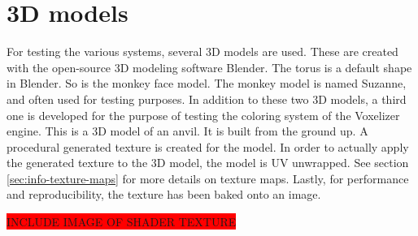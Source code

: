 \section{3D models}
For testing the various systems, several 3D models are used. These are created with the open-source 3D modeling software Blender. The torus is a default shape in Blender. So is the monkey face model. The monkey model is named Suzanne, and often used for testing purposes. In addition to these two 3D models, a third one is developed for the purpose of testing the coloring system of the Voxelizer engine. This is a 3D model of an anvil. It is built from the ground up. A procedural generated texture is created for the model. In order to actually apply the generated texture to the 3D model, the model is UV unwrapped. See section \ref{sec:info-texture-maps} for more details on texture maps. Lastly, for performance and reproducibility, the texture has been baked onto an image.

\colorbox{red}{INCLUDE IMAGE OF SHADER TEXTURE}